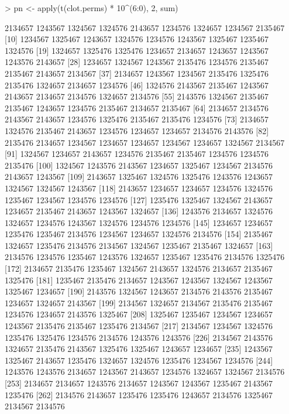 \documentclass{scrartcl}
\begin{document}
\begin{Schunk}
\begin{Sinput}
> pn <- apply(t(clot.perms) * 10^(6:0), 2, sum)
\end{Sinput}
\begin{Soutput}
   [1] 2134657 1243567 1324567 1324576 2143657 1234576 1324657 1234567 2135467
  [10] 1234567 1325467 1243657 1324576 1234576 1243567 1325467 1235467 1324576
  [19] 1324657 1325476 1325476 1234657 2134657 1243657 1243567 1243576 2143657
  [28] 1234657 1324567 1243567 2135476 1234576 2135467 2135467 2143657 2134567
  [37] 2134657 1243567 1234567 2135476 1325476 2135476 1324657 2134657 1234576
  [46] 1324576 2143567 2135467 1243567 2143657 2134657 2134576 1324657 2134576
  [55] 2143576 1324567 2135467 2135467 1243657 1234576 2135467 2134657 2135467
  [64] 2134657 2134576 2143567 2143657 1234576 1325476 2135467 2135476 1234576
  [73] 2134657 1324576 2135467 2143657 1234576 1234657 1234657 2134576 2143576
  [82] 2135476 2134657 1234567 1234657 1234657 1234567 1234657 1324567 2134567
  [91] 1324567 1234657 2143657 1234576 2135467 2135467 1234576 1234576 2135476
 [100] 1324567 1243576 2143567 1234657 1325467 1234567 2134576 2143657 1243567
 [109] 2143657 1325467 1324576 1325476 1243576 1243657 1324567 1324567 1243567
 [118] 2143657 1234657 1234657 1234576 1324576 1235467 1234567 1234576 1234576
 [127] 1235476 1325467 1324567 2143657 1234657 2135467 2143657 1243567 1324657
 [136] 1243576 2134657 1324576 1324657 1234576 1243567 1324576 1234576 1234576
 [145] 1234657 1234657 1235476 1235467 2134576 1234567 1234657 1324576 2134576
 [154] 2135467 1324657 1235476 2134576 2134567 1324567 1235467 2135467 1324657
 [163] 2134576 1234576 1235467 1243576 1324657 1235467 1235476 2134576 1325476
 [172] 2134657 2135476 1235467 1324567 2143657 1324576 2134657 2135467 1325476
 [181] 1235467 2135476 2134657 1243567 1243567 1324567 1243567 1325467 1234657
 [190] 2143576 1324567 1243657 2134576 2143576 2135467 1234657 1324657 2143567
 [199] 2134567 1324657 2134567 2135476 2135467 1234576 1234657 2143576 1325467
 [208] 1325467 1235467 1234567 1234657 1243567 2135476 2135467 1235476 2134567
 [217] 2134567 1234567 1324576 1235476 1325476 1234576 2134576 1243576 1243576
 [226] 2134567 2143576 1324657 2135476 2143567 1325476 1325467 1243657 1234657
 [235] 1243567 1325467 2143657 1235476 1324657 1324576 1235476 1234567 1234576
 [244] 1243576 1243576 2134657 1243567 2143657 1234576 1324657 1324567 2134576
 [253] 2134657 2134657 1243576 2134657 1243567 1243567 1235467 2143567 1235476
 [262] 2134576 2143657 1235476 1235476 1243657 2134576 1325467 2134567 2134576

\end{Soutput}
\end{Schunk}
\end{document}

